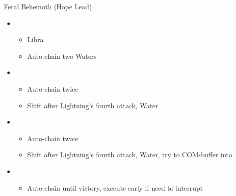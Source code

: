 \begin{multicols}{2}
\begin{battle}{Feral Behemoth (Hope Lead)}
\begin{itemize}
    \item \first
    \begin{itemize}
        \item Libra
        \item Auto-chain two Waters
    \end{itemize}
    \item \fourth
    \begin{itemize}
        \item Auto-chain twice
        \item Shift after Lightning's fourth attack, Water
    \end{itemize}
    \item \fifth
    \begin{itemize}
        \item Auto-chain twice
        \item Shift after Lightning's fourth attack, Water, try to COM-buffer into
    \end{itemize}
    \item \sixth
    \begin{itemize}
        \item Auto-chain until victory, execute early if need to interrupt
    \end{itemize}
\end{itemize}
\end{battle}


\end{multicols}
